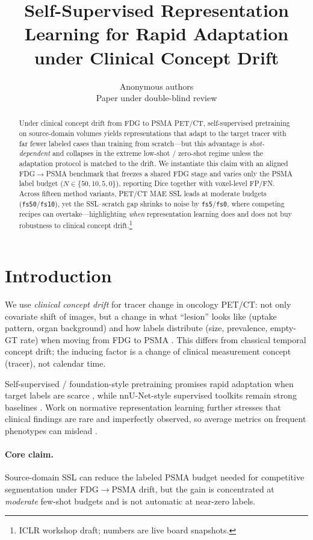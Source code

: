 \documentclass{article} %
\title{Self-Supervised Representation Learning for Rapid Adaptation\\
under Clinical Concept Drift}
\author{
Anonymous authors\\
Paper under double-blind review
}
\begin{document}
\maketitle

\begin{abstract}
Under clinical concept drift from FDG to PSMA PET/CT, self-supervised pretraining
on source-domain volumes yields representations that adapt to the target tracer with
far fewer labeled cases than training from scratch---but this advantage is
\emph{shot-dependent} and collapses in the extreme low-shot / zero-shot regime unless
the adaptation protocol is matched to the drift.
We instantiate this claim with an aligned FDG$\rightarrow$PSMA benchmark that freezes a
shared FDG stage and varies only the PSMA label budget
($N\in\{50,10,5,0\}$), reporting Dice together with voxel-level FP/FN.
Across fifteen method variants, PET/CT MAE SSL leads at moderate budgets
(\texttt{fs50}/\texttt{fs10}), yet the SSL--scratch gap shrinks to noise by
\texttt{fs5}/\texttt{fs0}, where competing recipes can overtake---highlighting
\emph{when} representation learning does and does not buy robustness to clinical
concept drift.\footnote{ICLR workshop draft; numbers are live board snapshots.}
\end{abstract}

\section{Introduction}
\label{sec:intro}

We use \emph{clinical concept drift} for tracer change in oncology PET/CT: not only
covariate shift of images, but a change in what ``lesion'' looks like (uptake
pattern, organ background) and how labels distribute (size, prevalence,
empty-GT rate) when moving from FDG to PSMA \citep{yixinchen2025hitchhiker}.
This differs from classical temporal concept drift; the inducing factor is a
change of clinical measurement concept (tracer), not calendar time.

Self-supervised / foundation-style pretraining promises rapid adaptation when
target labels are scarce \citep{he2022mae,tang2022self,mae_petct_arxiv}, while
nnU-Net-style supervised toolkits remain strong baselines \citep{isensee2021nnu}.
Work on normative representation learning further stresses that clinical findings
are rare and imperfectly observed, so average metrics on frequent phenotypes can
mislead \citep{bercea2025normative,bercea2025nova}.

\paragraph{Core claim.}
Source-domain SSL can reduce the labeled PSMA budget needed for competitive
segmentation under FDG$\rightarrow$PSMA drift, but the gain is concentrated at
\emph{moderate} few-shot budgets and is not automatic at near-zero labels.
\end{document}
